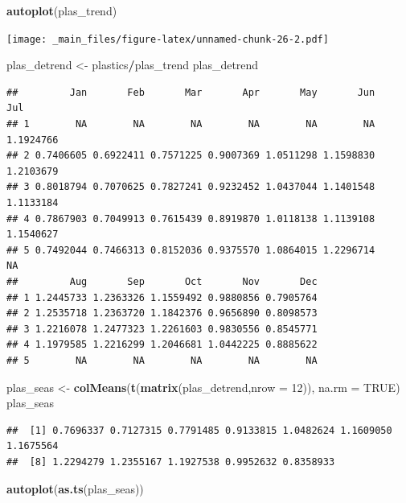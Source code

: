 \documentclass[]{book}
\newenvironment{Shaded}{\begin{snugshade}}{\end{snugshade}}
\newcommand{\DataTypeTok}[1]{\textcolor[rgb]{0.13,0.29,0.53}{#1}}
\newcommand{\DecValTok}[1]{\textcolor[rgb]{0.00,0.00,0.81}{#1}}
\newcommand{\KeywordTok}[1]{\textcolor[rgb]{0.13,0.29,0.53}{\textbf{#1}}}
\newcommand{\NormalTok}[1]{#1}
\newcommand{\OperatorTok}[1]{\textcolor[rgb]{0.81,0.36,0.00}{\textbf{#1}}}
\newcommand{\OtherTok}[1]{\textcolor[rgb]{0.56,0.35,0.01}{#1}}
\newcommand{\StringTok}[1]{\textcolor[rgb]{0.31,0.60,0.02}{#1}}
\begin{document}
\begin{Shaded}
\begin{Highlighting}[]
\KeywordTok{autoplot}\NormalTok{(plas_trend)}
\end{Highlighting}
\end{Shaded}

\texttt{[image: \_main\_files/figure-latex/unnamed-chunk-26-2.pdf]}

\begin{Shaded}
\begin{Highlighting}[]
\NormalTok{plas_detrend <-}\StringTok{ }\NormalTok{plastics}\OperatorTok{/}\NormalTok{plas_trend}
\NormalTok{plas_detrend}
\end{Highlighting}
\end{Shaded}

\begin{verbatim}
##         Jan       Feb       Mar       Apr       May       Jun       Jul
## 1        NA        NA        NA        NA        NA        NA 1.1924766
## 2 0.7406605 0.6922411 0.7571225 0.9007369 1.0511298 1.1598830 1.2103679
## 3 0.8018794 0.7070625 0.7827241 0.9232452 1.0437044 1.1401548 1.1133184
## 4 0.7867903 0.7049913 0.7615439 0.8919870 1.0118138 1.1139108 1.1540627
## 5 0.7492044 0.7466313 0.8152036 0.9375570 1.0864015 1.2296714        NA
##         Aug       Sep       Oct       Nov       Dec
## 1 1.2445733 1.2363326 1.1559492 0.9880856 0.7905764
## 2 1.2535718 1.2363720 1.1842376 0.9656890 0.8098573
## 3 1.2216078 1.2477323 1.2261603 0.9830556 0.8545771
## 4 1.1979585 1.2216299 1.2046681 1.0442225 0.8885622
## 5        NA        NA        NA        NA        NA
\end{verbatim}

\begin{Shaded}
\begin{Highlighting}[]
\NormalTok{plas_seas <-}\StringTok{ }\KeywordTok{colMeans}\NormalTok{(}\KeywordTok{t}\NormalTok{(}\KeywordTok{matrix}\NormalTok{(plas_detrend,}\DataTypeTok{nrow =} \DecValTok{12}\NormalTok{)), }\DataTypeTok{na.rm =} \OtherTok{TRUE}\NormalTok{)}
\NormalTok{plas_seas}
\end{Highlighting}
\end{Shaded}

\begin{verbatim}
##  [1] 0.7696337 0.7127315 0.7791485 0.9133815 1.0482624 1.1609050 1.1675564
##  [8] 1.2294279 1.2355167 1.1927538 0.9952632 0.8358933
\end{verbatim}

\begin{Shaded}
\begin{Highlighting}[]
\KeywordTok{autoplot}\NormalTok{(}\KeywordTok{as.ts}\NormalTok{(plas_seas))}
\end{Highlighting}
\end{Shaded}
\end{document}
